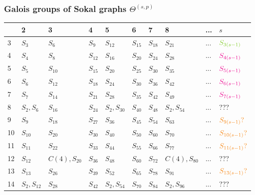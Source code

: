\documentclass{beamer}
\begin{document}
\begin{frame}[shrink=10]
\frametitle{Galois groups of Sokal graphs $\Theta^{(s,p)}$}

\scriptsize %
\begin{tabular}{| p{} | p{} | p{} | p{} | p{} | p{} | p{} | p{} | p{} | p{} | } %
    \hline
      & 2 & 3 & 4 & 5 & 6 & 7 & 8 & ... & $s$ \\
    \hline
    3 & $S_{3}$ & $S_{6}$ & $S_{9}$ & $S_{12}$ & $S_{15}$ & $S_{18}$ & $S_{21}$ & ... & $\color{LimeGreen} S_{3(s-1)}$ \\ 
    \hline
    4 & $S_{4}$ & $S_{8}$ & $S_{12}$ & $S_{16}$ & $S_{20}$ & $S_{24}$ & $S_{28}$ & ... & $\color{Magenta} S_{4(s-1)}$  \\ 
    \hline
    5 & $S_{5}$ & $S_{10}$ & $S_{15}$ & $S_{20}$ & $S_{25}$ & $S_{30}$ & $S_{35}$ & ... & $\color{Magenta} S_{5(s-1)}$ \\ 
    \hline
    6 & $S_{6}$ & $S_{12}$ & $S_{18}$ & $S_{24}$ & $S_{30}$ & $S_{36}$ & $S_{42}$ & ... & $\color{Magenta} S_{6(s-1)}$ \\ 
    \hline
    7 & $S_{7}$ & $S_{14}$ & $S_{21}$ & $S_{28}$ & $S_{35}$ & $S_{42}$ & $S_{49}$ & ... & $\color{Magenta} S_{7(s-1)}$ \\ 
    \hline
    8 & $S_{2}, S_{6}$ & $S_{16}$ & $S_{24}$ & $S_{2}, S_{30}$ & $S_{40}$ & $S_{48}$ & $S_{2}, S_{54}$ & ... & ??? \\ 
    \hline
    9 & $S_{9}$ & $S_{18}$ & $S_{27}$ & $S_{36}$ & $S_{45}$ & $S_{54}$ & $S_{63}$ & ... & $\color{BurntOrange} S_{9(s-1)}?$ \\ 
    \hline
    10 & $S_{10}$ & $S_{20}$ & $S_{30}$ & $S_{40}$ & $S_{50}$ & $S_{60}$ & $S_{70}$ & ... & $\color{BurntOrange} S_{10(s-1)}?$ \\ 
    \hline
    11 & $S_{11}$ & $S_{22}$ & $S_{33}$ & $S_{44}$ & $S_{55}$ & $S_{66}$ & $S_{77}$ & ... & $\color{BurntOrange} S_{11(s-1)}?$ \\ 
    \hline
    12 & $S_{12}$ & $C(4), S_{20}$ & $S_{36}$ & $S_{48}$ & $S_{60}$ & $S_{72}$ & $C(4), S_{80}$ & ... & ??? \\ 
    \hline
    13 & $S_{13}$ & $S_{26}$ & $S_{39}$ & $S_{52}$ & $S_{65}$ & $S_{78}$ & $S_{91}$ & ... & $\color{BurntOrange} S_{13(s-1)}?$ \\ 
    \hline
    14 & $S_{2}, S_{12}$ & $S_{28}$ & $S_{42}$ & $S_{2}, S_{54}$ & $S_{70}$ & $S_{84}$ & $S_{2}, S_{96}$ & ... & ??? \\ 

\end{tabular}
\end{frame}
\end{document}
